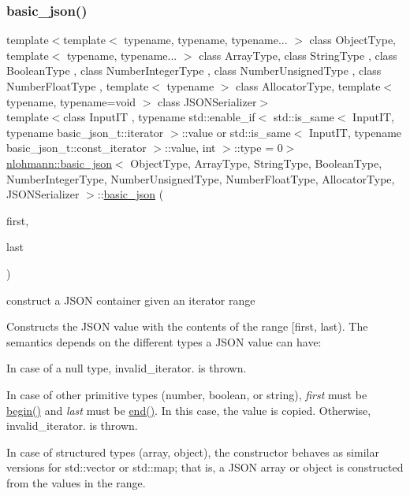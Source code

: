 \subsubsection{\texorpdfstring{basic\+\_\+json()}{basic\_json()}\hspace{0.1cm}{\footnotesize\ttfamily [6/9]}}
{\footnotesize\ttfamily template$<$template$<$ typename, typename, typename... $>$ class Object\+Type, template$<$ typename, typename... $>$ class Array\+Type, class String\+Type , class Boolean\+Type , class Number\+Integer\+Type , class Number\+Unsigned\+Type , class Number\+Float\+Type , template$<$ typename $>$ class Allocator\+Type, template$<$ typename, typename=void $>$ class J\+S\+O\+N\+Serializer$>$ \\
template$<$class Input\+IT , typename std\+::enable\+\_\+if$<$ std\+::is\+\_\+same$<$ Input\+I\+T, typename basic\+\_\+json\+\_\+t\+::iterator $>$\+::value or std\+::is\+\_\+same$<$ Input\+I\+T, typename basic\+\_\+json\+\_\+t\+::const\+\_\+iterator $>$\+::value, int $>$\+::type  = 0$>$ \\
\hyperlink{classnlohmann_1_1basic__json}{nlohmann\+::basic\+\_\+json}$<$ Object\+Type, Array\+Type, String\+Type, Boolean\+Type, Number\+Integer\+Type, Number\+Unsigned\+Type, Number\+Float\+Type, Allocator\+Type, J\+S\+O\+N\+Serializer $>$\+::\hyperlink{classnlohmann_1_1basic__json}{basic\+\_\+json} (\begin{DoxyParamCaption}\item[{Input\+IT}]{first,  }\item[{Input\+IT}]{last }\end{DoxyParamCaption})\hspace{0.3cm}{\ttfamily [inline]}}



construct a J\+S\+ON container given an iterator range 

Constructs the J\+S\+ON value with the contents of the range {\ttfamily \mbox{[}first, last)}. The semantics depends on the different types a J\+S\+ON value can have\+:
\begin{DoxyItemize}
\item In case of a null type, invalid\+\_\+iterator. is thrown.
\item In case of other primitive types (number, boolean, or string), {\itshape first} must be {\ttfamily \hyperlink{classnlohmann_1_1basic__json_a0ff28dac23f2bdecee9564d07f51dcdc}{begin()}} and {\itshape last} must be {\ttfamily \hyperlink{classnlohmann_1_1basic__json_a13e032a02a7fd8a93fdddc2fcbc4763c}{end()}}. In this case, the value is copied. Otherwise, invalid\+\_\+iterator. is thrown.
\item In case of structured types (array, object), the constructor behaves as similar versions for {\ttfamily std\+::vector} or {\ttfamily std\+::map}; that is, a J\+S\+ON array or object is constructed from the values in the range.
\end{DoxyItemize}


